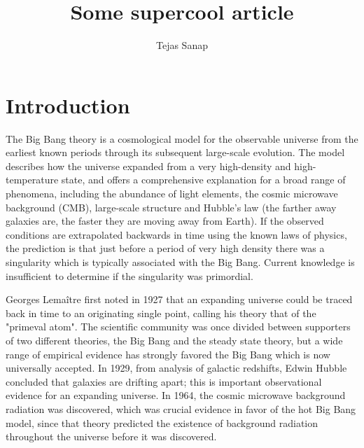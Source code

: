 \documentclass{IEEEtran}
\title{Some supercool article}
\author{Tejas Sanap}
\begin{document}
	\maketitle

	\section{Introduction}
		The Big Bang theory is a cosmological model for the observable universe from the earliest known periods through its subsequent large-scale evolution\cite{2004biba.book.....S}. The model describes how the universe expanded from a very high-density and high-temperature state, and offers a comprehensive explanation for a broad range of phenomena, including the abundance of light elements, the cosmic microwave background (CMB), large-scale structure and Hubble's law (the farther away galaxies are, the faster they are moving away from Earth). If the observed conditions are extrapolated backwards in time using the known laws of physics, the prediction is that just before a period of very high density there was a singularity which is typically associated with the Big Bang. Current knowledge is insufficient to determine if the singularity was primordial.
		
		Georges Lemaître first noted in 1927 that an expanding universe could be traced back in time to an originating single point, calling his theory that of the "primeval atom". The scientific community was once divided between supporters of two different theories, the Big Bang and the steady state theory, but a wide range of empirical evidence has strongly favored the Big Bang which is now universally accepted\cite{kragh1999cosmology}. In 1929, from analysis of galactic redshifts, Edwin Hubble concluded that galaxies are drifting apart; this is important observational evidence for an expanding universe. In 1964, the cosmic microwave background radiation was discovered, which was crucial evidence in favor of the hot Big Bang model\cite{partridge20073k}, since that theory predicted the existence of background radiation throughout the universe before it was discovered.
\end{document}
